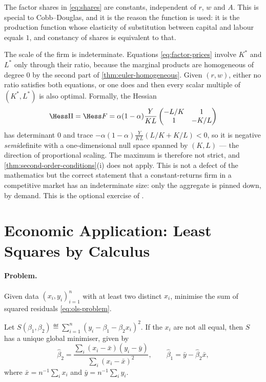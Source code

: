 The factor shares in \eqref{eq:shares} are constants, independent of $r$, $w$ and
$A$. This is special to Cobb--Douglas, and it is the reason the function is used:
it is the production function whose elasticity of substitution between capital
and labour equals $1$, and constancy of shares is equivalent to that.

The scale of the firm is indeterminate. Equations \eqref{eq:factor-prices}
involve $K^\ast$ and $L^\ast$ only through their ratio, because the marginal
products are homogeneous of degree $0$ by the second part of
\autoref{thm:euler-homogeneous}. Given $(r,w)$, either no ratio satisfies both
equations, or one does and then every scalar multiple of $(K^\ast,L^\ast)$ is
also optimal. Formally, the Hessian
\[
	\Hess\Pi=\Hess F=
	\alpha(1-\alpha)\frac{Y}{KL}
	\begin{pmatrix}
		-L/K & 1     \\
		1    & -K/L
	\end{pmatrix}
\]
has determinant $0$ and trace $-\alpha(1-\alpha)\frac{Y}{KL}(L/K+K/L)<0$, so it
is negative \emph{semi}definite with a one-dimensional null space spanned by
$(K,L)$ --- the direction of proportional scaling. The maximum is therefore not
strict, and \autoref{thm:second-order-conditions}(i) does not apply. This is not a
defect of the mathematics but the correct statement that a constant-returns firm
in a competitive market has an indeterminate size: only the aggregate is pinned
down, by demand. This is the optional exercise of
\autocite[slides 43, 54]{fukuda2026calculus}.

\section{Economic Application: Least Squares by Calculus}\label{sec:cn-ols}

\paragraph{Problem.} Given data $(x_i,y_i)_{i=1}^n$ with at least two distinct
$x_i$, minimise the sum of squared residuals \eqref{eq:ols-problem}.

\begin{proposition}\label{prop:ols-calculus}
	Let $S(\beta_1,\beta_2)\eqdef\sum_{i=1}^n(y_i-\beta_1-\beta_2x_i)^2$. If the
	$x_i$ are not all equal, then $S$ has a unique global minimiser, given by
	\begin{equation}\label{eq:ols-solution}
		\hat\beta_2=\frac{\sum_i(x_i-\bar x)(y_i-\bar y)}{\sum_i(x_i-\bar x)^2},
		\qquad
		\hat\beta_1=\bar y-\hat\beta_2\bar x,
	\end{equation}
	where $\bar x=n^{-1}\sum_ix_i$ and $\bar y=n^{-1}\sum_iy_i$.
\end{proposition}

